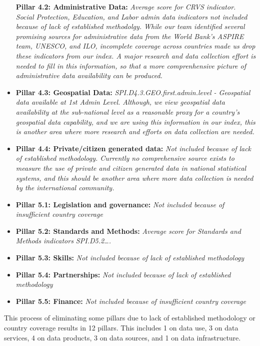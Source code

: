 \documentclass[
]{article}
\begin{document}
\begin{itemize}
  \textbf{Pillar 4.2: Administrative Data:} \emph{Average score for CRVS indicator. Social Protection, Education, and Labor admin data indicators not included because of lack of established methodolgy. While our team identified several promising sources for administrative data from the World Bank's ASPIRE team, UNESCO, and ILO, incomplete coverage across countries made us drop these indicators from our index. A major research and data collection effort is needed to fill in this information, so that a more comprenhensive picture of administrative data availability can be produced. }\\
\item
  \textbf{Pillar 4.3: Geospatial Data:} \emph{SPI.D4.3.GEO.first.admin.level - Geospatial data available at 1st Admin Level. Although, we view geospatial data availability at the sub-national level as a reasonable proxy for a country's geospatial data capability, and we are using this information in our index, this is another area where more research and efforts on data collection are needed.}
\item
  \textbf{Pillar 4.4: Private/citizen generated data:} \emph{Not included because of lack of established methodology. Currently no comprehensive source exists to measure the use of private and citizen generated data in national statistical systems, and this should be another area where more data collection is needed by the international community.}
\item
  \textbf{Pillar 5.1: Legislation and governance:} \emph{Not included because of insufficient country coverage}\\
\item
  \textbf{Pillar 5.2: Standards and Methods:} \emph{Average score for Standards and Methods indicators SPI.D5.2\ldots.}\\
\item
  \textbf{Pillar 5.3: Skills:} \emph{Not included because of lack of established methodology}\\
\item
  \textbf{Pillar 5.4: Partnerships:} \emph{Not included because of lack of established methodology}\\
\item
  \textbf{Pillar 5.5: Finance:} \emph{Not included because of insufficient country coverage}
\end{itemize}

This process of eliminating some pillars due to lack of established methodology or country coverage results in 12 pillars. This includes 1 on data use, 3 on data services, 4 on data products, 3 on data sources, and 1 on data infrastructure.
\end{document}
